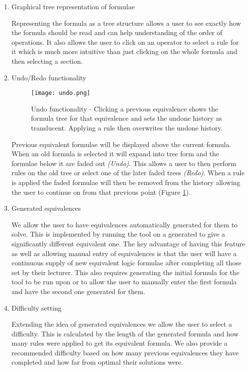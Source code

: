 \documentclass{report}
\begin{document}
\begin{enumerate}
\item Graphical tree representation of formulae

Representing the formula as a tree structure allows a user to see exactly how the formula should be read and can help understanding of the order of operations. It also allows the user to click on an operator to select a rule for it which is much more intuitive than just clicking on the whole formula and then selecting a section.

\item Undo/Redo functionality

\begin{figure}[ht]
    \centering
    \texttt{[image: undo.png]}
    \caption{Undo functionality - Clicking a previous equivalence shows the formula tree for that equivalence and sets the undone history as translucent. Applying a rule then overwrites the undone history.}
    \label{undo}
\end{figure}

Previous equivalent formulae will be displayed above the current formula. When an old formula is selected it will expand into tree form and the formulae below it are faded out \textit{(Undo)}. This allows a user to then perform rules on the old tree or select one of the later faded trees \textit{(Redo)}. When a rule is applied the faded formulae will then be removed from the history allowing the user to continue on from that previous point (Figure \ref{undo}).

\item Generated equivalences

We allow the user to have equivalences automatically generated for them to solve. This is implemented by running the tool on a generated to give a significantly different equivalent one. The key advantage of having this feature as well as allowing manual entry of equivalences is that the user will have a continuous supply of new equivalent logic formulae after completing all those set by their lecturer. This also requires generating the initial formula for the tool to be run upon or to allow the user to manually enter the first formula and have the second one generated for them.

\item Difficulty setting

Extending the idea of generated equivalences we allow the user to select a difficulty. This is calculated by the length of the generated formula and how many rules were applied to get its equivalent formula. We also provide a recommended difficulty based on how many previous equivalences they have completed and how far from optimal their solutions were.


\end{enumerate}
\end{document}
